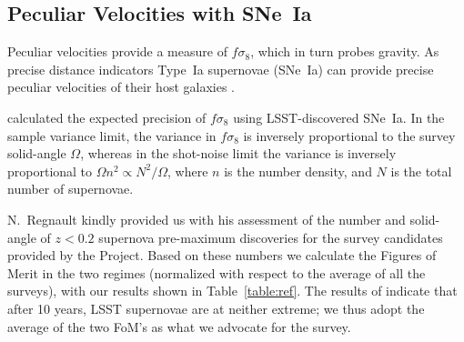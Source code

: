 \documentclass{aastex62}   	%
\begin{document}
\subsection{Peculiar Velocities with SNe~Ia}
Peculiar velocities provide a measure of $f\sigma_8$, which in turn probes gravity.  As precise distance indicators Type~Ia supernovae (SNe~Ia)
can provide precise peculiar velocities of their host galaxies \citep{2006PhRvD..73l3526H,2011ApJ...741...67D}.

\citet{2017ApJ...847..128H} calculated the  expected precision of $f\sigma_8$ using LSST-discovered SNe~Ia.
In the sample variance limit, the variance in $f\sigma_8$ is inversely proportional to the survey solid-angle $\Omega$, whereas
in the shot-noise limit the variance is inversely proportional to $\Omega n^2 \propto N^2/\Omega$, where $n$ is the number density,
and $N$ is the total number of supernovae.  

N.~Regnault kindly provided us with his assessment of the number and solid-angle of $z<0.2$ supernova pre-maximum discoveries 
for the survey candidates provided by the Project.  Based on these numbers we calculate the Figures of Merit in the two regimes 
(normalized with respect to the average of all the surveys),
with our results shown in 
Table~\ref{table:ref}.  The results of \citet{2017ApJ...847..128H}  indicate that after 10 years,
LSST supernovae are at neither extreme; we thus adopt the average of the two FoM's as what we advocate for the survey.
\end{document}
